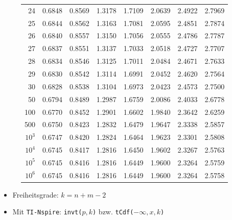\begin{figure}[h!]
\begin{center}
\begin{tabular}{|r|rrrrrrr|}
24&0.6848&0.8569&1.3178&1.7109&2.0639&2.4922&2.7969\\
25&0.6844&0.8562&1.3163&1.7081&2.0595&2.4851&2.7874\\
26&0.6840&0.8557&1.3150&1.7056&2.0555&2.4786&2.7787\\
27&0.6837&0.8551&1.3137&1.7033&2.0518&2.4727&2.7707\\
28&0.6834&0.8546&1.3125&1.7011&2.0484&2.4671&2.7633\\
29&0.6830&0.8542&1.3114&1.6991&2.0452&2.4620&2.7564\\
30&0.6828&0.8538&1.3104&1.6973&2.0423&2.4573&2.7500\\
50&0.6794&0.8489&1.2987&1.6759&2.0086&2.4033&2.6778\\
100&0.6770&0.8452&1.2901&1.6602&1.9840&2.3642&2.6259\\
500&0.6750&0.8423&1.2832&1.6479&1.9647&2.3338&2.5857\\
$10^3$&0.6747&0.8420&1.2824&1.6464&1.9623&2.3301&2.5808\\
$10^4$&0.6745&0.8417&1.2816&1.6450&1.9602&2.3267&2.5763\\
$10^5$&0.6745&0.8416&1.2816&1.6449&1.9600&2.3264&2.5759\\
$10^6$&0.6745&0.8416&1.2816&1.6449&1.9600&2.3264&2.5758\\
\hline
\end{tabular}
\end{center}
\end{figure}

\begin{itemize}
  \item Freiheitsgrade: $k = n + m - 2$
  \item Mit \texttt{TI-Nspire}: \texttt{invt($p,k$)} bzw. \texttt{tCdf($-\infty,x,k$)}
\end{itemize}
